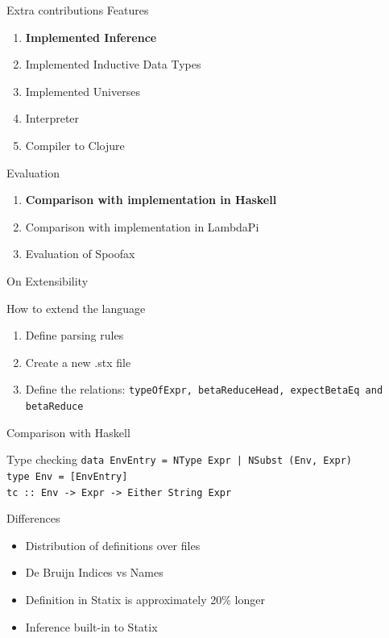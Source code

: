 \documentclass[aspectratio=43]{beamer}
\begin{document}
\begin{frame}[fragile]{Extra contributions}
Features
\begin{enumerate}
	\item \textbf{Implemented Inference}
	\item Implemented Inductive Data Types
	\item Implemented Universes
	\item Interpreter
	\item Compiler to Clojure
\end{enumerate}
Evaluation
\begin{enumerate}
	\item \textbf{Comparison with implementation in Haskell}
	\item Comparison with implementation in LambdaPi
	\item Evaluation of Spoofax
\end{enumerate}
\end{frame}

\begin{frame}{On Extensibility}
	\begin{block}{How to extend the language}
		\begin{enumerate}
			\item Define parsing rules
			\item Create a new .stx file
			\item Define the relations: \texttt{typeOfExpr, betaReduceHead, expectBetaEq and betaReduce}
		\end{enumerate}
	\end{block}
\end{frame}

\begin{frame}{Comparison with Haskell}
	\begin{block}{Type checking}
		\texttt{data EnvEntry = NType Expr | NSubst (Env, Expr)
			\\type Env = [EnvEntry]
			\\tc :: Env -> Expr -> Either String Expr}
	\end{block}

	\begin{block}{Differences}
		\begin{itemize}
			\item Distribution of definitions over files
			\item De Bruijn Indices vs Names
			\item Definition in Statix is approximately 20\% longer
			\item Inference built-in to Statix
		\end{itemize}
	\end{block}
\end{frame}
\end{document}
